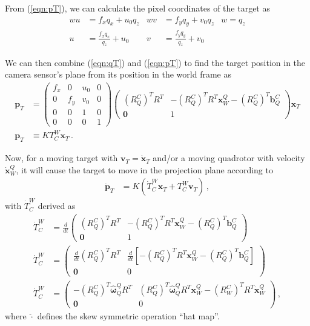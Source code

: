 \documentclass[11pt]{article}
\begin{document}
From (\ref{eqn:pT}), we can calculate the pixel coordinates of the target as
\begin{align}
    wu&=f_xq_x+u_0q_z & wv&=f_yq_y+v_0q_z & w=q_z\nonumber\\
    u&=\frac{f_xq_x}{q_z}+u_0 & v&=\frac{f_yq_y}{q_z}+v_0\label{eqn:pixels}
\end{align}

We can then combine (\ref{eqn:qT}) and (\ref{eqn:pT}) to find the target position in the camera sensor's plane from its position in the world frame as
\begin{align}
    \mathbf p_T&=\begin{pmatrix}
        f_x & 0 & u_0 & 0\\
        0 & f_y & v_0 & 0\\
        0 & 0 & 1 & 0\\
        0 & 0 & 0 & 1
    \end{pmatrix}\begin{pmatrix}
        (R_Q^C)^TR^T & -(R_Q^C)^TR^T\mathbf x_W^Q-(R_Q^C)^T\mathbf b_Q^C\\\mathbf0 & 1
    \end{pmatrix}\mathbf x_T\nonumber\\
    \mathbf p_T&\equiv KT_C^W\mathbf x_T\,.\label{eqn:PTcomp}
\end{align}

Now, for a moving target with $\mathbf v_T=\dot{\mathbf x}_T$ and/or a moving quadrotor with velocity $\dot{\mathbf x}_W^Q$, it will cause the target to move in the projection plane according to
\begin{align}\label{eqn:PTd}
    \dot{\mathbf p}_T&=K(\dot T_C^W\mathbf x_T+T_C^W\mathbf v_T)\,,
\end{align}
with $\dot T_C^W$ derived as
\begin{align}
    \dot T_C^W&=\frac{d}{dt}\begin{pmatrix}
        (R_Q^C)^TR^T & -(R_Q^C)^TR^T\mathbf x_W^Q-(R_Q^C)^T\mathbf b_Q^C\\\mathbf0 & 1
    \end{pmatrix}\nonumber\\
    \dot T_C^W&=\begin{pmatrix}
        \frac{d}{dt}(R_Q^C)^TR^T & \frac{d}{dt}\left[-(R_Q^C)^TR^T\mathbf x_W^Q-(R_Q^C)^T\mathbf b_Q^C\right]\\\mathbf0 & 0
    \end{pmatrix}\nonumber\\
    \dot T_C^W&=\begin{pmatrix}
        -(R_Q^C)^T\widehat{\boldsymbol\omega}_Q^QR^T & (R_Q^C)^T\widehat{\boldsymbol\omega}_Q^QR^T\mathbf x_W^Q-(R_W^C)^TR^T\dot{\mathbf x}_W^Q\\\mathbf0 & 0
    \end{pmatrix}\,,\label{eqn:TCWd}
\end{align}
where $\widehat{\cdot}$ defines the skew symmetric operation ``hat map''.
\end{document}
